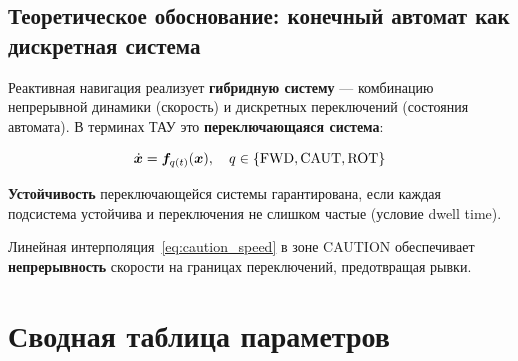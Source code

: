 \begin{center}
\end{center}

\subsection{Теоретическое обоснование: конечный автомат как дискретная система}

Реактивная навигация реализует \textbf{гибридную систему} ---
комбинацию непрерывной динамики (скорость) и дискретных переключений
(состояния автомата). В терминах ТАУ это \textbf{переключающаяся система}:

\begin{equation}
  \dot{\bm{x}} = \bm{f}_{q(t)}(\bm{x}), \quad q \in \{\text{FWD}, \text{CAUT}, \text{ROT}\}
  \label{eq:switching_system}
\end{equation}

\textbf{Устойчивость} переключающейся системы гарантирована, если
каждая подсистема устойчива и переключения не слишком частые
(условие dwell time).

Линейная интерполяция~\eqref{eq:caution_speed} в зоне CAUTION
обеспечивает \textbf{непрерывность} скорости на границах переключений,
предотвращая рывки.

\section{Сводная таблица параметров}

